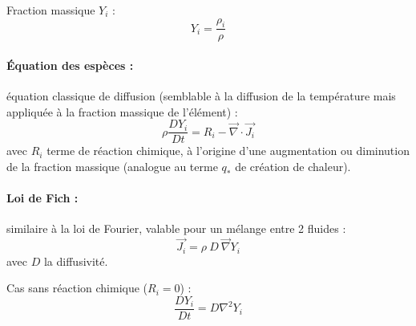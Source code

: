 Fraction massique $Y_i$ :
%
\begin{equation}
Y_i = \frac{\rho_i}{\rho}
\end{equation}

\paragraph{Équation des espèces :} équation classique de diffusion (semblable à la diffusion de la température mais appliquée à la fraction massique de l'élément) :
%
\begin{equation}
\rho \frac{DY_i}{Dt} = R_i - \vec{\nabla} \cdot \vec{J_i}
\end{equation}
%
avec $R_i$ terme de réaction chimique, à l'origine d'une augmentation ou diminution de la fraction massique (analogue au terme $q_*$ de création de chaleur).

\paragraph{Loi de Fich :}similaire à la loi de Fourier, valable pour un mélange entre 2 fluides :
%
\begin{equation}
\vec{J_i} = \rho~D~\vec{\nabla} Y_i
\end{equation}
%
avec $D$ la diffusivité.

Cas sans réaction chimique ($R_i=0$) :
%
\begin{equation}
\frac{DY_i}{Dt} = D \nabla^2 Y_i
\end{equation}
